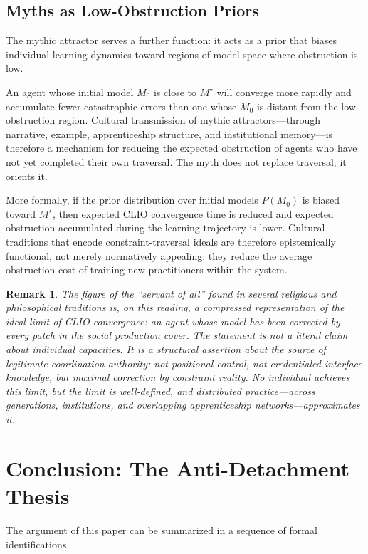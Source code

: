 \documentclass[12pt]{article}
\newtheorem{remark}{Remark}
\begin{document}
\subsection{Myths as Low-Obstruction Priors}

The mythic attractor serves a further function: it acts as a prior that biases individual learning dynamics toward regions of model space where obstruction is low.

An agent whose initial model $M_0$ is close to $M^\star$ will converge more rapidly and accumulate fewer catastrophic errors than one whose $M_0$ is distant from the low-obstruction region. Cultural transmission of mythic attractors---through narrative, example, apprenticeship structure, and institutional memory---is therefore a mechanism for reducing the expected obstruction of agents who have not yet completed their own traversal. The myth does not replace traversal; it orients it.

More formally, if the prior distribution over initial models $P(M_0)$ is biased toward $M^\star$, then expected CLIO convergence time is reduced and expected obstruction accumulated during the learning trajectory is lower. Cultural traditions that encode constraint-traversal ideals are therefore epistemically functional, not merely normatively appealing: they reduce the average obstruction cost of training new practitioners within the system.

\begin{remark}
The figure of the ``servant of all'' found in several religious and philosophical traditions is, on this reading, a compressed representation of the ideal limit of CLIO convergence: an agent whose model has been corrected by every patch in the social production cover. The statement is not a literal claim about individual capacities. It is a structural assertion about the source of legitimate coordination authority: not positional control, not credentialed interface knowledge, but maximal correction by constraint reality. No individual achieves this limit, but the limit is well-defined, and distributed practice---across generations, institutions, and overlapping apprenticeship networks---approximates it.
\end{remark}

\section{Conclusion: The Anti-Detachment Thesis}

The argument of this paper can be summarized in a sequence of formal identifications.
\end{document}
